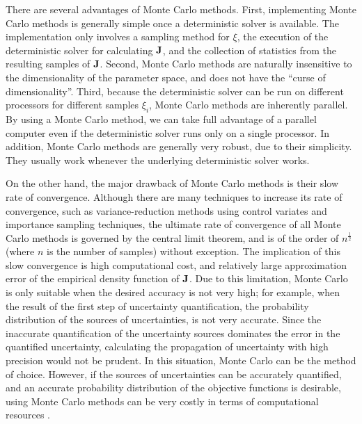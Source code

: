 There are several advantages of
Monte Carlo methods.  First, implementing Monte Carlo methods is generally
simple once a deterministic solver is available.  The implementation only
involves a sampling method for $\xi$, the execution of the deterministic
solver for calculating $\bf J$, and the collection of statistics
from the resulting samples of $\bf J$.
Second, Monte Carlo methods are naturally insensitive to the dimensionality
of the parameter space, and does not have the ``curse of dimensionality''.
Third, because the deterministic solver can be run on different
processors for different samples $\xi_i$, Monte Carlo methods are inherently
parallel.  By using a Monte Carlo method, we can take full advantage of a
parallel computer even if the
deterministic solver runs only on a single processor.  In addition,
Monte Carlo methods are generally very robust, due to their simplicity.
They usually work whenever the underlying deterministic solver works.

On the other hand, the major drawback of Monte Carlo methods
is their slow rate of convergence.  Although there are many techniques to
increase its rate of convergence, such as variance-reduction methods using
control variates and importance sampling techniques,
the ultimate rate of convergence
of all Monte Carlo methods is governed by the central limit theorem,
and is of the order of $n^{\frac12}$ (where $n$ is the number of samples)
without exception.
The implication of this slow convergence is high computational cost, and
relatively large approximation error of the empirical density function
of $\bf J$.
Due to this limitation, Monte Carlo is only suitable when the desired accuracy
is not very high; for example, when the result of the first step of
uncertainty quantification, the probability distribution of the sources of
uncertainties, is not very accurate.  Since the inaccurate quantification
of the uncertainty sources dominates the error in the quantified uncertainty,
calculating the propagation
of uncertainty with high precision would not be prudent.
In this situation, Monte Carlo can be the method of choice.
However, if the sources of uncertainties can be accurately quantified, and
an accurate probability distribution of the objective functions is desirable,
using Monte Carlo methods can be very costly in terms of computational
resources \cite[]{Rubinstein1981} \cite[]{monte3}.

